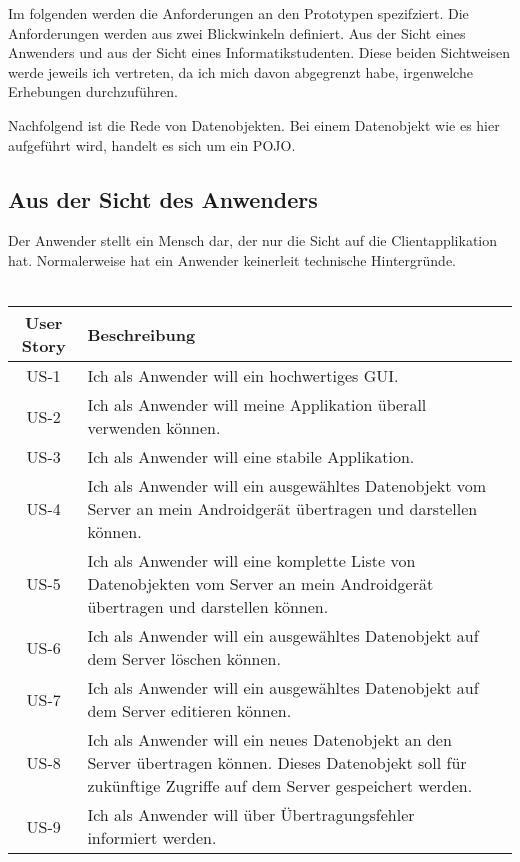 \documentclass[listof=totocnumbered, bibliography=totocnumbered]{scrreprt}
\begin{document}
  Im folgenden werden die Anforderungen an den Prototypen spezifziert. Die
  Anforderungen werden aus zwei Blickwinkeln definiert. Aus der Sicht eines
  Anwenders und aus der Sicht eines Informatikstudenten. Diese beiden
  Sichtweisen werde jeweils ich vertreten, da ich mich davon abgegrenzt habe,
  irgenwelche Erhebungen durchzuführen.
  
  Nachfolgend ist die Rede von Datenobjekten. Bei einem Datenobjekt wie es hier
  aufgeführt wird, handelt es sich um ein \ac{POJO}. 
  
  \subsection{Aus der Sicht des Anwenders}
  
  Der Anwender stellt ein Mensch dar, der nur die Sicht auf die
  Clientapplikation hat. Normalerweise hat ein Anwender keinerleit technische
  Hintergründe.\\
  \\
  \begin{tabular}{cp{13cm}l}
    \toprule
    User Story & Beschreibung \\
    \midrule
    US-1 & Ich als Anwender will ein hochwertiges \ac{GUI}. \\
    US-2 & Ich als Anwender will meine Applikation überall verwenden können. \\
    US-3 & Ich als Anwender will eine stabile Applikation. \\
    US-4 & Ich als Anwender will ein ausgewähltes Datenobjekt vom Server an mein
    Androidgerät übertragen und darstellen können. \\
    US-5 & Ich als Anwender will eine komplette Liste von Datenobjekten vom
    Server an mein Androidgerät übertragen und darstellen können. \\
    US-6 & Ich als Anwender will ein ausgewähltes Datenobjekt auf dem Server
    löschen können. \\
    US-7 & Ich als Anwender will ein ausgewähltes Datenobjekt auf dem Server
    editieren können. \\
    US-8 & Ich als Anwender will ein neues Datenobjekt an den Server übertragen
    können. Dieses Datenobjekt soll für zukünftige Zugriffe auf dem Server
    gespeichert werden. \\
    US-9 & Ich als Anwender will über Übertragungsfehler informiert werden. \\
    \bottomrule
  \end{tabular}
  
\end{document}
